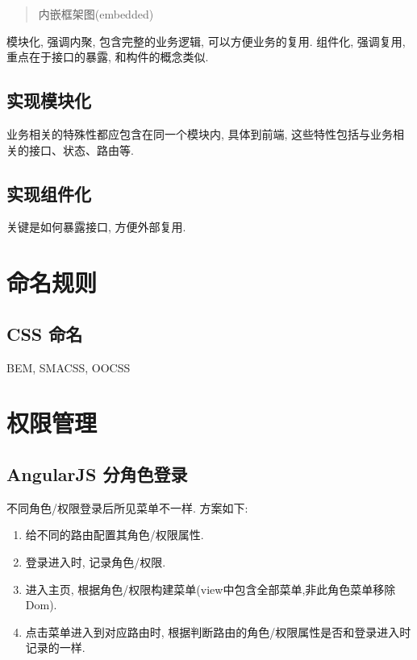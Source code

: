 \begin{quote}
内嵌框架图(embedded)
\end{quote}

模块化, 强调内聚, 包含完整的业务逻辑, 可以方便业务的复用. 组件化,
强调复用, 重点在于接口的暴露, 和构件的概念类似.

\subsection{实现模块化}\label{ux5b9eux73b0ux6a21ux5757ux5316}

业务相关的特殊性都应包含在同一个模块内, 具体到前端,
这些特性包括与业务相关的接口、状态、路由等.

\subsection{实现组件化}\label{ux5b9eux73b0ux7ec4ux4ef6ux5316}

关键是如何暴露接口, 方便外部复用.

\section{命名规则}\label{ux547dux540dux89c4ux5219}

\subsection{CSS 命名}\label{css-ux547dux540d}

BEM, SMACSS, OOCSS

\section{权限管理}\label{ux6743ux9650ux7ba1ux7406}

\subsection{AngularJS
分角色登录}\label{angularjs-ux5206ux89d2ux8272ux767bux5f55}

不同角色/权限登录后所见菜单不一样. 方案如下:

\begin{enumerate}
\def\labelenumi{\arabic{enumi}.}
\tightlist
\item
  给不同的路由配置其角色/权限属性.
\item
  登录进入时, 记录角色/权限.
\item
  进入主页, 根据角色/权限构建菜单(view中包含全部菜单,非此角色菜单移除
  Dom).
\item
  点击菜单进入到对应路由时,
  根据判断路由的角色/权限属性是否和登录进入时记录的一样.
\end{enumerate}

